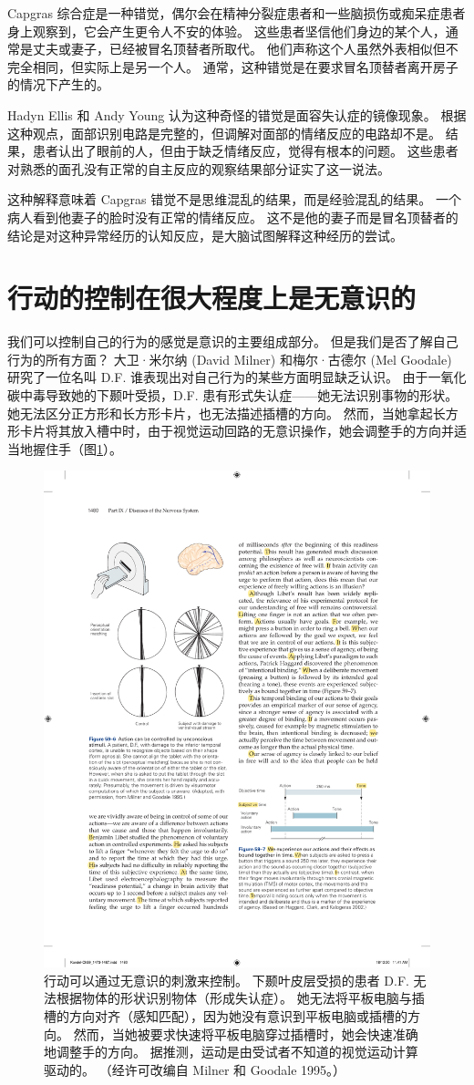 Capgras 综合症是一种错觉，偶尔会在精神分裂症患者和一些脑损伤或痴呆症患者身上观察到，它会产生更令人不安的体验。 这些患者坚信他们身边的某个人，通常是丈夫或妻子，已经被冒名顶替者所取代。 他们声称这个人虽然外表相似但不完全相同，但实际上是另一个人。 通常，这种错觉是在要求冒名顶替者离开房子的情况下产生的。

Hadyn Ellis 和 Andy Young 认为这种奇怪的错觉是面容失认症的镜像现象。 根据这种观点，面部识别电路是完整的，但调解对面部的情绪反应的电路却不是。 结果，患者认出了眼前的人，但由于缺乏情绪反应，觉得有根本的问题。 这些患者对熟悉的面孔没有正常的自主反应的观察结果部分证实了这一说法。

这种解释意味着 Capgras 错觉不是思维混乱的结果，而是经验混乱的结果。 一个病人看到他妻子的脸时没有正常的情绪反应。 这不是他的妻子而是冒名顶替者的结论是对这种异常经历的认知反应，是大脑试图解释这种经历的尝试。

\section{行动的控制在很大程度上是无意识的}
我们可以控制自己的行为的感觉是意识的主要组成部分。 但是我们是否了解自己行为的所有方面？ 大卫·米尔纳 (David Milner) 和梅尔·古德尔 (Mel Goodale) 研究了一位名叫 D.F. 谁表现出对自己行为的某些方面明显缺乏认识。 由于一氧化碳中毒导致她的下颞叶受损，D.F. 患有形式失认症——她无法识别事物的形状。 她无法区分正方形和长方形卡片，也无法描述插槽的方向。 然而，当她拿起长方形卡片将其放入槽中时，由于视觉运动回路的无意识操作，她会调整手的方向并适当地握住手（图\ref{fig:59_6}）。

\begin{figure}[htbp]
	\centering
	\includegraphics[width=0.5\linewidth]{chap59/fig_59_6}
	\caption{行动可以通过无意识的刺激来控制。 下颞叶皮层受损的患者 D.F. 无法根据物体的形状识别物体（形成失认症）。 她无法将平板电脑与插槽的方向对齐（感知匹配），因为她没有意识到平板电脑或插槽的方向。 然而，当她被要求快速将平板电脑穿过插槽时，她会快速准确地调整手的方向。 据推测，运动是由受试者不知道的视觉运动计算驱动的。 （经许可改编自 Milner 和 Goodale 1995。）}
	\label{fig:59_6}
\end{figure}


